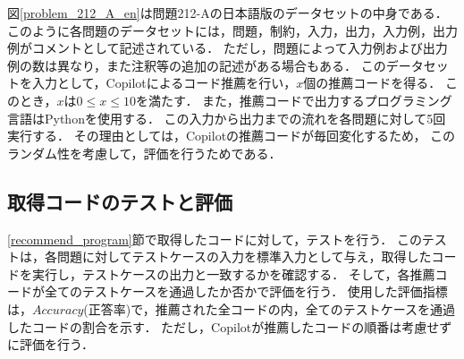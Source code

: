    図\ref{problem_212_A_en}は問題212-Aの日本語版のデータセットの中身である\cite{AtCoder}．
    このように各問題のデータセットには，問題，制約，入力，出力，入力例，出力例がコメントとして記述されている．
    ただし，問題によって入力例および出力例の数は異なり，また注釈等の追加の記述がある場合もある．
    このデータセットを入力として，Copilotによるコード推薦を行い，$x$個の推薦コードを得る．
    このとき，$x$は$0 {\leq} x {\leq} 10$を満たす．
    また，推薦コードで出力するプログラミング言語はPythonを使用する．
    この入力から出力までの流れを各問題に対して5回実行する．
    その理由としては，Copilotの推薦コードが毎回変化するため，
    このランダム性を考慮して，評価を行うためである．
    
  \subsection{取得コードのテストと評価\label{test_and_evaluation}}
    \ref{recommend_program}節で取得したコードに対して，テストを行う．
    このテストは，各問題に対してテストケースの入力を標準入力として与え，取得したコードを実行し，テストケースの出力と一致するかを確認する．
    そして，各推薦コードが全てのテストケースを通過したか否かで評価を行う．
    使用した評価指標は，$Accuracy$(正答率)で，推薦された全コードの内，全てのテストケースを通過したコードの割合を示す．
    ただし，Copilotが推薦したコードの順番は考慮せずに評価を行う．

